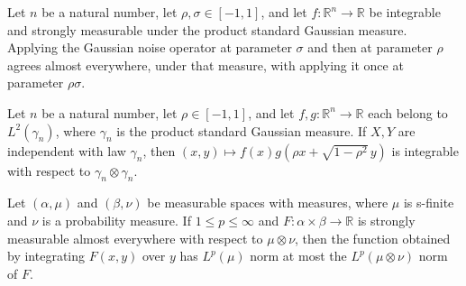 \begin{lemma}
\label{BooleanAnalysis.GaussianSpace.gaussianNoise_compose_stronglyMeasurable}
\leanok
{}
Let $n$ be a natural number, let $\rho,\sigma\in[-1,1]$, and let $f:\mathbb
R^n\to\mathbb R$ be integrable and strongly measurable under the product standard
Gaussian measure. Applying the Gaussian noise operator at parameter $\sigma$ and then at
parameter $\rho$ agrees almost everywhere, under that measure, with applying it once at
parameter $\rho\sigma$.
\end{lemma}

\begin{lemma}
\label{BooleanAnalysis.GaussianSpace.integrable_gaussianNoise_pair_mul}
\leanok
{}
Let $n$ be a natural number, let $\rho\in[-1,1]$, and let $f,g:\mathbb R^n\to\mathbb R$
each belong to $L^2(\gamma_n)$, where $\gamma_n$ is the product standard Gaussian
measure. If $X,Y$ are independent with law $\gamma_n$, then $(x,y)\mapsto f(x)g(\rho
x+\sqrt{1-\rho^2}\,y)$ is integrable with respect to $\gamma_n\otimes\gamma_n$.
\end{lemma}

\begin{lemma}
\label{BooleanAnalysis.GaussianSpace.eLpNorm_integral_prod_le}
\leanok
{}
Let $(\alpha,\mu)$ and $(\beta,\nu)$ be measurable spaces with measures, where $\mu$ is
s-finite and $\nu$ is a probability measure. If $1\le p\le\infty$ and
$F:\alpha\times\beta\to\mathbb R$ is strongly measurable almost everywhere with respect
to $\mu\otimes\nu$, then the function obtained by integrating $F(x,y)$ over $y$ has
$L^p(\mu)$ norm at most the $L^p(\mu\otimes\nu)$ norm of $F$.
\end{lemma}


